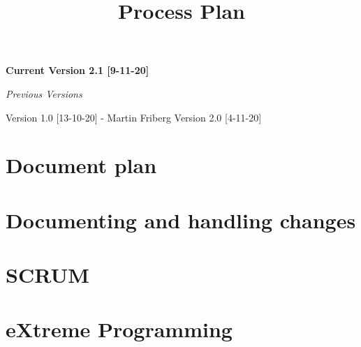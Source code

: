 \documentclass[12pt]{article}
\title{\Huge Process Plan}
\author{}
\begin{document}
\maketitle

\begin{center}
    \textbf{\large Current Version 2.1 [9-11-20]}
    \vspace{10mm}
    
    \emph{\large Previous Versions}
    
    
    Version 1.0 [13-10-20] - Martin Friberg
    Version 2.0 [4-11-20]
\end{center}


\clearpage

    \section{Document plan}
    

    \clearpage
    \section{Documenting and handling changes}
        

    \section{SCRUM}
        
        
    \section{eXtreme Programming}
        
    
\end{document}
